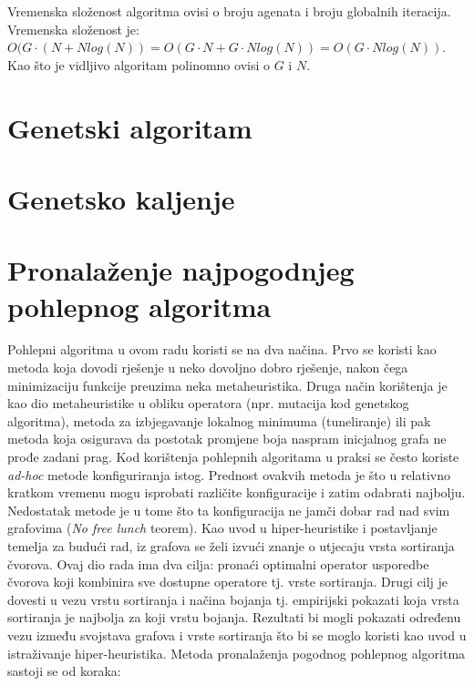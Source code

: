 \documentclass[times, utf8, diplomski, numeric]{fer}
\begin{document}
Vremenska složenost algoritma ovisi o broju agenata i broju globalnih iteracija. Vremenska složenost je: $O(G\cdot(N+Nlog(N))=O(G\cdot N+G\cdot Nlog(N))=O(G\cdot Nlog(N))$. Kao što je vidljivo algoritam polinomno ovisi o $G$ i $N$.

\section{Genetski algoritam}



\section{Genetsko kaljenje}


\section{Pronalaženje najpogodnjeg pohlepnog algoritma}

Pohlepni algoritma u ovom radu koristi se na dva načina. Prvo se koristi kao metoda koja dovodi rješenje u neko dovoljno dobro rješenje, nakon čega minimizaciju funkcije preuzima neka metaheuristika. Druga način korištenja je kao dio metaheuristike u obliku operatora (npr. mutacija kod genetskog algoritma), metoda za izbjegavanje lokalnog minimuma (tuneliranje) ili pak metoda koja osigurava da postotak promjene boja naspram inicjalnog grafa ne prođe zadani prag. Kod korištenja pohlepnih algoritama u praksi se često koriste \emph{ad-hoc} metode konfiguriranja istog. Prednost ovakvih metoda je što u relativno kratkom vremenu mogu isprobati različite konfiguracije i zatim odabrati najbolju. Nedostatak metode je u tome što ta konfiguracija ne jamči dobar rad nad svim grafovima (\emph{No free lunch} teorem). Kao uvod u hiper-heuristike i postavljanje temelja za budući rad, iz grafova se želi izvući znanje o utjecaju vrsta sortiranja čvorova. Ovaj dio rada ima dva cilja: pronaći optimalni operator usporedbe čvorova koji kombinira sve dostupne operatore tj. vrste sortiranja. Drugi cilj je dovesti u vezu vrstu sortiranja i načina bojanja tj. empirijski pokazati koja vrsta sortiranja je najbolja za koji vrstu bojanja. Rezultati bi mogli pokazati određenu vezu između svojstava grafova i vrste sortiranja što bi se moglo koristi kao uvod u istraživanje hiper-heuristika. Metoda pronalaženja pogodnog pohlepnog algoritma sastoji se od koraka:
\end{document}
